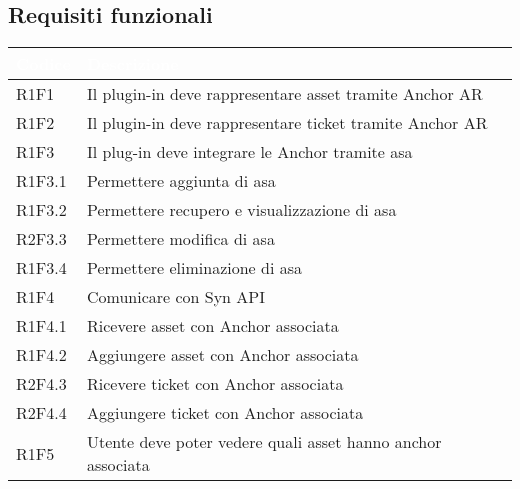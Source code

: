 \subsection{Requisiti funzionali}

{
    \setlength{\freewidth}{\dimexpr\textwidth-10\tabcolsep}
    \renewcommand{\arraystretch}{1.5}
    \centering
    \setlength{\aboverulesep}{0pt}
    \setlength{\belowrulesep}{0pt}
    \begin{longtable}{C{.15\freewidth} | C{1\freewidth}}
       \toprule
    \textcolor{white}{\textbf{Codice}}&
    \textcolor{white}{\textbf{Descrizione}}\\
    \toprule
    \endhead
    
\iffalse
    &\\
    &\\
    &\\
    &\\
    &\\
\fi
    R1F1 & Il plugin-in deve rappresentare asset tramite Anchor AR\\
    R1F2 & Il plugin-in deve rappresentare ticket tramite Anchor AR\\
    R1F3 & Il plug-in deve integrare le Anchor tramite asa\\
    R1F3.1 & Permettere aggiunta di asa\\%
    R1F3.2 & Permettere recupero e visualizzazione di asa\\%
    R2F3.3 & Permettere modifica di asa\\%
    R1F3.4 & Permettere eliminazione di asa\\%
    R1F4 & Comunicare con Syn API\\
    R1F4.1 & Ricevere asset con Anchor associata\\
    R1F4.2 & Aggiungere asset con Anchor associata\\
    R2F4.3 & Ricevere ticket con Anchor associata\\
    R2F4.4 & Aggiungere ticket con Anchor associata\\
    R1F5 & Utente deve poter vedere quali asset hanno anchor associata\\

\end{longtable}}
